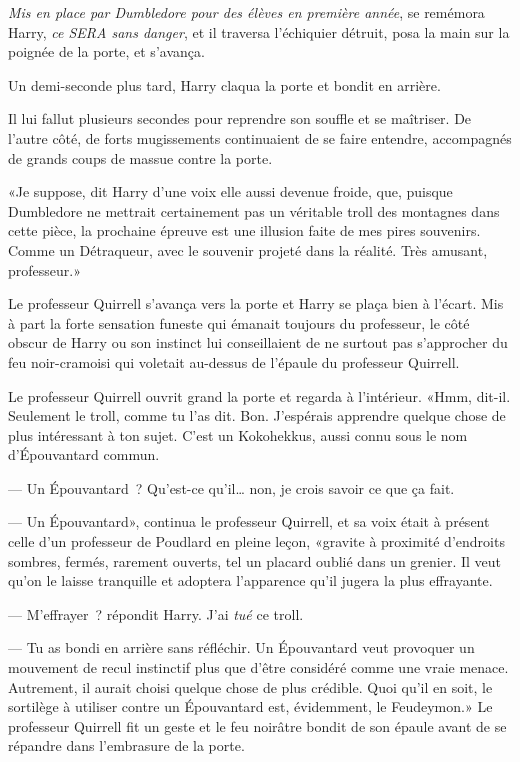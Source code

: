 \emph{Mis en place par Dumbledore pour des élèves en première année}, se remémora Harry, \emph{ce SERA sans danger}, et il traversa l'échiquier détruit, posa la main sur la poignée de la porte, et s'avança.

\later

Un demi-seconde plus tard, Harry claqua la porte et bondit en arrière.

Il lui fallut plusieurs secondes pour reprendre son souffle et se maîtriser. De l'autre côté, de forts mugissements continuaient de se faire entendre, accompagnés de grands coups de massue contre la porte.

«Je suppose, dit Harry d'une voix elle aussi devenue froide, que, puisque Dumbledore ne mettrait certainement pas un véritable troll des montagnes dans cette pièce, la prochaine épreuve est une illusion faite de mes pires souvenirs. Comme un Détraqueur, avec le souvenir projeté dans la réalité. Très amusant, professeur.»

Le professeur Quirrell s'avança vers la porte et Harry se plaça bien à l'écart. Mis à part la forte sensation funeste qui émanait toujours du professeur, le côté obscur de Harry ou son instinct lui conseillaient de ne surtout pas s'approcher du feu noir-cramoisi qui voletait au-dessus de l'épaule du professeur Quirrell.

Le professeur Quirrell ouvrit grand la porte et regarda à l'intérieur. «Hmm, dit-il. Seulement le troll, comme tu l'as dit. Bon. J'espérais apprendre quelque chose de plus intéressant à ton sujet. C'est un Kokohekkus, aussi connu sous le nom d'Épouvantard commun.

--- Un Épouvantard~? Qu'est-ce qu'il… non, je crois savoir ce que ça fait.

--- Un Épouvantard», continua le professeur Quirrell, et sa voix était à présent celle d'un professeur de Poudlard en pleine leçon, «gravite à proximité d'endroits sombres, fermés, rarement ouverts, tel un placard oublié dans un grenier. Il veut qu'on le laisse tranquille et adoptera l'apparence qu'il jugera la plus effrayante.

--- M'effrayer~? répondit Harry. J'ai \emph{tué} ce troll.

--- Tu as bondi en arrière sans réfléchir. Un Épouvantard veut provoquer un mouvement de recul instinctif plus que d'être considéré comme une vraie menace. Autrement, il aurait choisi quelque chose de plus crédible. Quoi qu'il en soit, le sortilège à utiliser contre un Épouvantard est, évidemment, le Feudeymon.» Le professeur Quirrell fit un geste et le feu noirâtre bondit de son épaule avant de se répandre dans l'embrasure de la porte.

